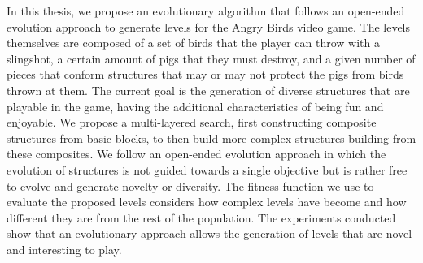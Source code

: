 In this thesis, we propose an evolutionary algorithm that follows an open-ended
evolution approach to generate levels for the Angry Birds video game. The levels
themselves are composed of a set of birds that the player can throw with a
slingshot, a certain amount of pigs that they must destroy, and a given number
of pieces that conform structures that may or may not protect the pigs from
birds thrown at them. The current goal is the generation of diverse structures
that are playable in the game, having the additional characteristics of being
fun and enjoyable. We propose a multi-layered search, first constructing
composite structures from basic blocks, to then build more complex structures
building from these composites. We follow an open-ended evolution approach in
which the evolution of structures is not guided towards a single objective but
is rather free to evolve and generate novelty or diversity. The fitness function
we use to evaluate the proposed levels considers how complex levels have become
and how different they are from the rest of the population. The experiments
conducted show that an evolutionary approach allows the generation of levels
that are novel and interesting to play.
